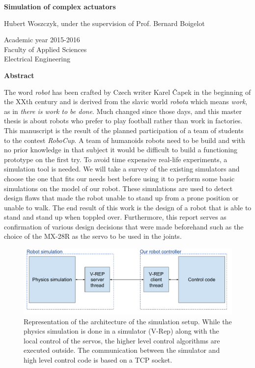 \thispagestyle{empty}
\begin{center}
    \Large
    \textbf{Simulation of complex actuators}
    
    \vspace{0.4cm}
    \large
    Hubert Woszczyk, under the supervision of Prof. Bernard Boigelot
    
    \normalsize
    Academic year 2015-2016\\
    Faculty of Applied Sciences\\
    Electrical Engineering
    
    \vspace{0.9cm}
    \textbf{Abstract}
\end{center}
The word \emph{robot} has been crafted by Czech writer Karel Čapek in the beginning of the XXth century and is derived from the slavic world \emph{robota} which means \emph{work}, as in \emph{there is work to be done}. Much changed since those days, and this master thesis is about robots who prefer to play football rather than work in factories. This manuscript is the result of the planned participation of a team of students to the contest \emph{RoboCup}. A team of humanoids robots need to be build and with no prior knowledge in that subject it would be difficult to build a functioning prototype on the first try. To avoid time expensive real-life experiments, a simulation tool is needed. We will take a survey of the existing simulators and choose the one that fits our needs best before using it to perform some basic simulations on the model of our robot. These simulations are used to detect design flaws that made the robot unable to stand up from a prone position or unable to walk. The end result of this work is the design of a robot that is able to stand and stand up when toppled over. Furthermore, this report serves as confirmation of various design decisions that were made beforehand such as the choice of the MX-28R as the servo to be used in the joints.
\clearpage

\thispagestyle{empty}
\vspace*{3cm}
\begin{figure}[htp]
\center
    \includegraphics[width = \textwidth]{figures/simulation_principles}
    \caption[]{Representation of the architecture of the simulation setup. While the physics simulation is done in a simulator (V-Rep) along with the local control of the servos, the higher level control algorithms are executed outside. The communication between the simulator and high level control code is based on a TCP socket.}
    \label{fig:abstract1}
\end{figure}

